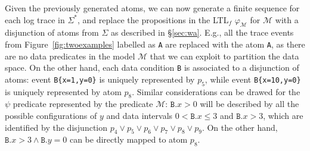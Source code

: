 
Given the previously generated atoms, we can now generate a finite sequence for each log trace in $\Sigma^*$, and replace the propositions in the LTL$_f$ $\varphi_{\mathcal{M}}$ for $\mathcal{M}$ with a disjunction of atoms from $\Sigma$ as described in \S\ref{sec:wa}.
%
E.g., all the trace events from Figure~\ref{fig:twoexamples} labelled as \texttt{A} are replaced with the atom \texttt{A}, as there are no data predicates in the model $\mathcal{M}$ that we can exploit to partition the data space. On the other hand, each data condition \texttt{B} is associated to a disjunction of atoms: event \texttt{B\{x=1,y=0\}} is uniquely represented by $p_5$, while event \texttt{B\{x=10,y=0\}} is uniquely represented by atom $p_8$. Similar considerations can be drawed for the $\psi$ predicate represented by the predicate $\mathcal{M}$: $\texttt{B}.x>0$ will be described by all the possible configurations of $y$ and data intervals $0<\texttt{B}.x\leq 3$ and $\texttt{B}.x>3$, which are identified by the disjunction $p_4\vee p_5\vee p_6\vee p_7\vee p_8\vee p_9$. On the other hand, $\texttt{B}.x>3\wedge \texttt{B}.y=0$ can be directly mapped to atom $p_8$.


